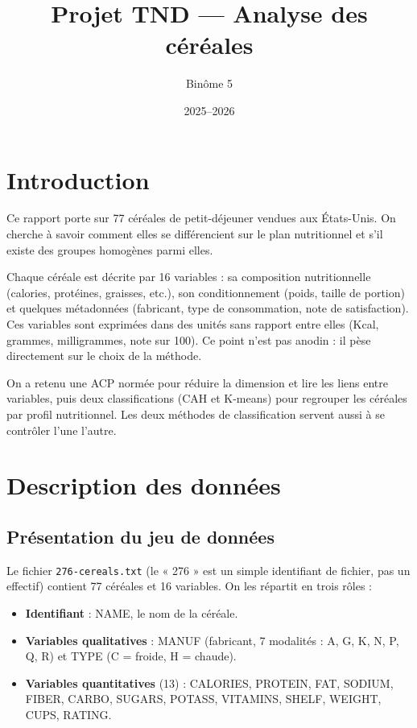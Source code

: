 \documentclass[11pt,a4paper]{article}
\title{Projet TND --- Analyse des céréales}
\author{Binôme 5}
\date{2025--2026}
\begin{document}
\maketitle
\tableofcontents
\newpage

\section{Introduction}

Ce rapport porte sur 77 céréales de petit-déjeuner vendues aux États-Unis. On cherche à savoir comment elles se différencient sur le plan nutritionnel et s'il existe des groupes homogènes parmi elles.

Chaque céréale est décrite par 16 variables : sa composition nutritionnelle (calories, protéines, graisses, etc.), son conditionnement (poids, taille de portion) et quelques métadonnées (fabricant, type de consommation, note de satisfaction). Ces variables sont exprimées dans des unités sans rapport entre elles (Kcal, grammes, milligrammes, note sur 100). Ce point n'est pas anodin : il pèse directement sur le choix de la méthode.

On a retenu une ACP normée pour réduire la dimension et lire les liens entre variables, puis deux classifications (CAH et K-means) pour regrouper les céréales par profil nutritionnel. Les deux méthodes de classification servent aussi à se contrôler l'une l'autre.

\section{Description des données}

\subsection{Présentation du jeu de données}

Le fichier \texttt{276-cereals.txt} (le « 276 » est un simple identifiant de fichier, pas un effectif) contient 77 céréales et 16 variables. On les répartit en trois rôles :

\begin{itemize}
\item \textbf{Identifiant} : NAME, le nom de la céréale.
\item \textbf{Variables qualitatives} : MANUF (fabricant, 7 modalités : A, G, K, N, P, Q, R) et TYPE (C = froide, H = chaude).
\item \textbf{Variables quantitatives} (13) : CALORIES, PROTEIN, FAT, SODIUM, FIBER, CARBO, SUGARS, POTASS, VITAMINS, SHELF, WEIGHT, CUPS, RATING.
\end{itemize}
\end{document}
